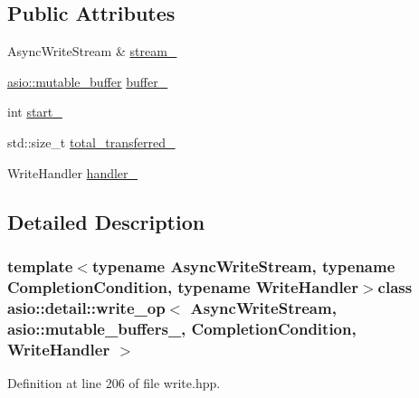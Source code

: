\subsection*{Public Attributes}
\begin{DoxyCompactItemize}
\item 
Async\+Write\+Stream \& \hyperlink{classasio_1_1detail_1_1write__op_3_01_async_write_stream_00_01asio_1_1mutable__buffers__1_00_01_203e79af9e8ed472722d2a863f7168cc_a6eaf85d425f3fbbf09beae615a465398}{stream\+\_\+}
\item 
\hyperlink{classasio_1_1mutable__buffer}{asio\+::mutable\+\_\+buffer} \hyperlink{classasio_1_1detail_1_1write__op_3_01_async_write_stream_00_01asio_1_1mutable__buffers__1_00_01_203e79af9e8ed472722d2a863f7168cc_abd0a53f2f29936807379f6ee76a406aa}{buffer\+\_\+}
\item 
int \hyperlink{classasio_1_1detail_1_1write__op_3_01_async_write_stream_00_01asio_1_1mutable__buffers__1_00_01_203e79af9e8ed472722d2a863f7168cc_a17fc0b35542316cc467061ada86393b5}{start\+\_\+}
\item 
std\+::size\+\_\+t \hyperlink{classasio_1_1detail_1_1write__op_3_01_async_write_stream_00_01asio_1_1mutable__buffers__1_00_01_203e79af9e8ed472722d2a863f7168cc_a00fca045b44c95411577cab89e34c41c}{total\+\_\+transferred\+\_\+}
\item 
Write\+Handler \hyperlink{classasio_1_1detail_1_1write__op_3_01_async_write_stream_00_01asio_1_1mutable__buffers__1_00_01_203e79af9e8ed472722d2a863f7168cc_a739503b7d3fb902fe1cfdd006921279c}{handler\+\_\+}
\end{DoxyCompactItemize}


\subsection{Detailed Description}
\subsubsection*{template$<$typename Async\+Write\+Stream, typename Completion\+Condition, typename Write\+Handler$>$class asio\+::detail\+::write\+\_\+op$<$ Async\+Write\+Stream, asio\+::mutable\+\_\+buffers\+\_,                           Completion\+Condition, Write\+Handler $>$}



Definition at line 206 of file write.\+hpp.



